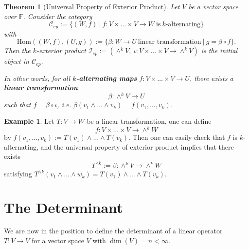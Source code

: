 \documentclass[11pt,openany]{book}
\theoremstyle{plain}
\newtheorem{theorem}{Theorem}[chapter]
\theoremstyle{definition}
\newtheorem{example}[example]{Example}
\theoremstyle{remark}
\begin{document}
\begin{theorem}[Universal Property of Exterior Product]
    Let $V$ be a vector space over $\mathbb{F}$. Consider the category
    $$\mathcal{C}_{ep} := \{(W,f)\ |\ f: V \times \dots \times V \to W\ \text{is}\ k\text{-alternating}\}$$
with
$$\mathrm{Hom}((W,f),(U,g)) := \{\beta : W \to U\ \text{linear transformation}\ |\ g = \beta \circ f\}.$$
Then the $k$-exterior product $\mathcal{I}_{ep} := (\wedge^k V,\ \iota: V \times \dots \times V \to \wedge^k V)$ is the initial object in $\mathcal{C}_{ep}$. 

In other words, for all {\bf $k$-alternating maps} $f: V \times \dots \times V \to U$, there exists a {\bf linear transformation} 
$$\beta: \wedge^k V  \to U$$
such that $f = \beta \circ \iota$, i.e. $\beta(v_1 \wedge \dots \wedge v_k) = f(v_1, \dots, v_k)$.
\end{theorem}

\begin{example}
Let $T: V \to W$ be a linear transformation, one can define
$$f: V \times \dots \times V \to \wedge^k W$$
by $f(v_1, \dots, v_k) := T(v_1) \wedge \dots \wedge T(v_k).$
Then one can easily check that $f$ is $k$-alternating, and the universal property of exterior product implies that there exists 
$$T^{\wedge k} := \beta: \wedge^k V \to \wedge^k W$$
satisfying $T^{\wedge k}(v_1 \wedge \dots \wedge w_k) = T(v_1) \wedge \dots \wedge T(v_k)$.
\end{example}

\section{The Determinant} \label{sec-det}
We are now in the position to define the determinant of a linear operator $T:V \to V$ for a vector space $V$ with $\dim(V) = n < \infty$.
\end{document}
